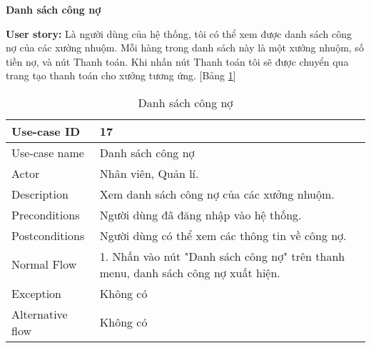 \textbf{Danh sách công nợ}\par
\textbf{User story:} Là người dùng của hệ thống, tôi có thể xem được danh sách công nợ của các xưởng nhuộm. Mỗi hàng trong danh sách này là một xưởng nhuộm, số tiền nợ, và nút Thanh toán. Khi nhấn nút Thanh toán tôi sẽ được chuyển qua trang tạo thanh toán cho xưởng tương ứng. [Bảng \ref{bang17}]
\begin{table}[H]
    \centering
    \begin{tabular}{|m{3cm}|m{10cm}|}
    \hline 
        Use-case ID & 17\\ \hline
        Use-case name & Danh sách công nợ\\ \hline
        Actor & Nhân viên, Quản lí.\\ \hline
        Description & Xem danh sách công nợ của các xưởng nhuộm.\\ \hline
        Preconditions & Người dùng đã đăng nhập vào hệ thống.\\ \hline
        Postconditions & Người dùng có thể xem các thông tin về công nợ.\\ \hline
        Normal Flow & 
        1. Nhấn vào nút "Danh sách công nợ" trên thanh menu, danh sách công nợ xuất hiện.
        \\ \hline
        Exception & Không có\\ \hline
        Alternative flow & Không có\\ 
    \hline 
    \end{tabular}
    \caption{Danh sách công nợ}
    \label{bang17}
\end{table}

